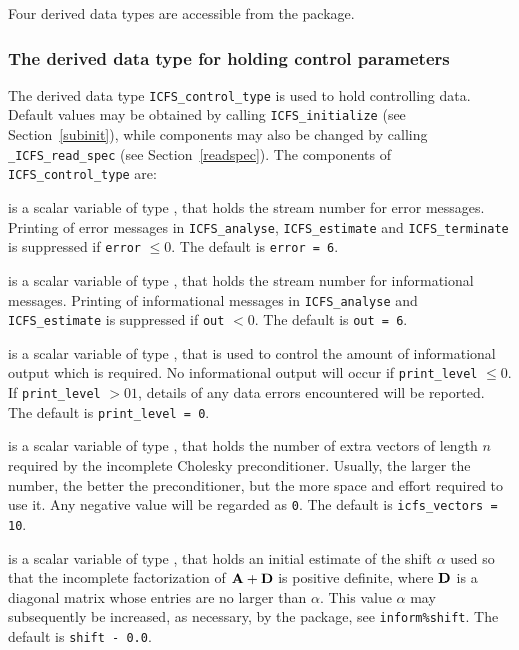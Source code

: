 \documentclass{galahad}
\newcommand{\packagename}{ICFS}
\newcommand{\fullpackagename}{\libraryname\_\packagename}
\begin{document}
\galtypes
Four derived data types are accessible from the package.


\subsubsection{The derived data type for holding control
 parameters}\label{typecontrol}
The derived data type
{\tt \packagename\_control\_type}
is used to hold controlling data. Default values may be obtained by calling
{\tt \packagename\_initialize}
(see Section~\ref{subinit}),
while components may also be changed by calling
{\tt \fullpackagename\_read\-\_spec}
(see Section~\ref{readspec}).
The components of
{\tt \packagename\_control\_type}
are:


\begin{description}

 is a scalar variable of type \integer, that holds the
stream number for error messages. Printing of error messages in
{\tt \packagename\_analyse},
{\tt \packagename\_estimate}
and {\tt \packagename\_terminate}
is suppressed if {\tt error} $\leq 0$.
The default is {\tt error = 6}.

 is a scalar variable of type \integer, that holds the
stream number for informational messages. Printing of informational messages in
{\tt \packagename\_analyse} and {\tt \packagename\_estimate}
is suppressed if {\tt out} $< 0$.
The default is {\tt out = 6}.

 is a scalar variable of type \integer, that is used
to control the amount of informational output which is required. No
informational output will occur if {\tt print\_level} $\leq 0$. If
{\tt print\_level} $> 01$, details of any data errors encountered
will be reported.
The default is {\tt print\_level = 0}.

 is a scalar variable of type \integer, that holds
the number of extra vectors of length $n$ required by the
incomplete Cholesky preconditioner.
Usually, the larger the number, the
better the preconditioner, but the more space and effort required to
use it. Any negative value will be regarded as {\tt 0}.
The default is {\tt icfs\_vectors = 10}.

 is a scalar variable of type \realdp, that holds
an initial estimate of the shift $\alpha$ used so that the incomplete
factorization of ${\mathbf{A}} + {\mathbf{D}}$ is positive definite, where ${\mathbf{D}}$ is
a diagonal matrix whose entries are no larger than $\alpha$.
This value $\alpha$ may subsequently be increased, as necessary, by the
package, see {\tt inform\%shift}.
The default is {\tt shift - 0.0}.


\end{description}
\end{document}
